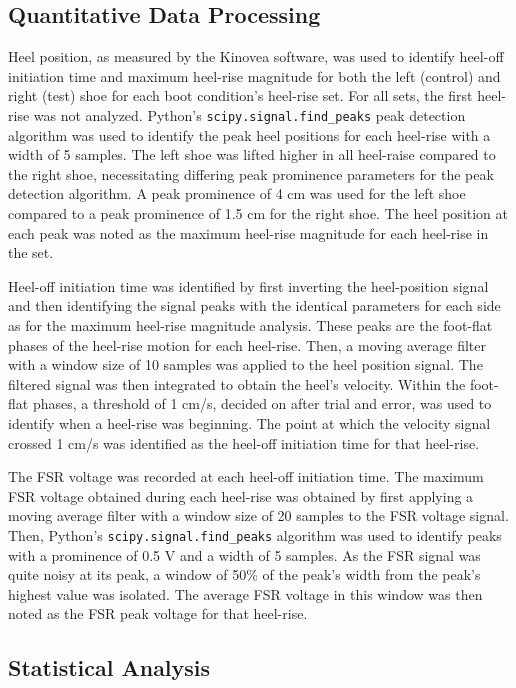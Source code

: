 \documentclass[defaultstyle,11pt]{comps}
\begin{document}
\hypertarget{quantitative-data-processing}{%
\subsection{Quantitative Data Processing}\label{quantitative-data-processing}}

Heel position, as measured by the Kinovea software, was used to identify heel-off initiation time and maximum heel-rise magnitude for both the left (control) and right (test) shoe for each boot condition's heel-rise set.
For all sets, the first heel-rise was not analyzed.
Python's \texttt{scipy.signal.find\_peaks} peak detection algorithm was used to identify the peak heel positions for each heel-rise with a width of 5 samples.
The left shoe was lifted higher in all heel-raise compared to the right shoe, necessitating differing peak prominence parameters for the peak detection algorithm.
A peak prominence of 4 cm was used for the left shoe compared to a peak prominence of 1.5 cm for the right shoe.
The heel position at each peak was noted as the maximum heel-rise magnitude for each heel-rise in the set.

Heel-off initiation time was identified by first inverting the heel-position signal and then identifying the signal peaks with the identical parameters for each side as for the maximum heel-rise magnitude analysis.
These peaks are the foot-flat phases of the heel-rise motion for each heel-rise.
Then, a moving average filter with a window size of 10 samples was applied to the heel position signal.
The filtered signal was then integrated to obtain the heel's velocity.
Within the foot-flat phases, a threshold of 1 cm/s, decided on after trial and error, was used to identify when a heel-rise was beginning.
The point at which the velocity signal crossed 1 cm/s was identified as the heel-off initiation time for that heel-rise.

The FSR voltage was recorded at each heel-off initiation time.
The maximum FSR voltage obtained during each heel-rise was obtained by first applying a moving average filter with a window size of 20 samples to the FSR voltage signal.
Then, Python's \texttt{scipy.signal.find\_peaks} algorithm was used to identify peaks with a prominence of 0.5 V and a width of 5 samples.
As the FSR signal was quite noisy at its peak, a window of 50\% of the peak's width from the peak's highest value was isolated.
The average FSR voltage in this window was then noted as the FSR peak voltage for that heel-rise.

\hypertarget{statistical-analysis}{%
\subsection{Statistical Analysis}\label{statistical-analysis}}
\end{document}
